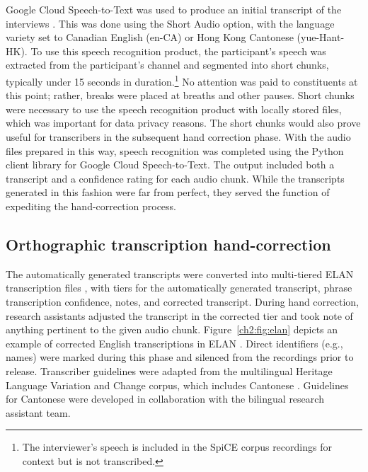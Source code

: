 Google Cloud Speech-to-Text was used to produce an initial transcript of the interviews \citep{google_2019_stt}. This was done using the Short Audio option, with the language variety set to Canadian English (en-CA) or Hong Kong Cantonese (yue-Hant-HK). To use this speech recognition product, the participant's speech was extracted from the participant's channel and segmented into short chunks, typically under 15 seconds in duration.\footnote{The interviewer's speech is included in the SpiCE corpus recordings for context but is not transcribed.} No attention was paid to constituents at this point; rather, breaks were placed at breaths and other pauses. Short chunks were necessary to use the speech recognition product with locally stored files, which was important for data privacy reasons. The short chunks would also prove useful for transcribers in the subsequent hand correction phase. With the audio files prepared in this way, speech recognition was completed using the Python client library for Google Cloud Speech-to-Text. The output included both a transcript and a confidence rating for each audio chunk. While the transcripts generated in this fashion were far from perfect, they served the function of expediting the hand-correction process.

\subsection{Orthographic transcription hand-correction}\label{ch2:subsec:orthographic}

The automatically generated transcripts were converted into multi-tiered ELAN transcription files \citep{sloetjes_2008_elan}, with tiers for the automatically generated transcript, phrase transcription confidence, notes, and corrected transcript. During hand correction, research assistants adjusted the transcript in the corrected tier and took note of anything pertinent to the given audio chunk. Figure~\ref{ch2:fig:elan} depicts an example of corrected English transcriptions in ELAN \citep{sloetjes_2008_elan}. Direct identifiers (e.g., names) were marked during this phase and silenced from the recordings prior to release. Transcriber guidelines were adapted from the multilingual Heritage Language Variation and Change corpus, which includes Cantonese \citep{nagy_2011_hlvc}. Guidelines for Cantonese were developed in collaboration with the bilingual research assistant team.

